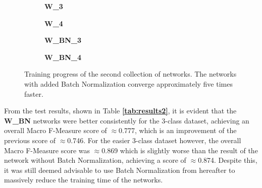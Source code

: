 \begin {figure}[!htb]
	\begin {subfigure}[b]{0.4\linewidth}
		\scalebox{0.65}{}
		\caption{\textbf{W\_3}}
	\end {subfigure}\hspace{1.75cm}
	\begin {subfigure}[b]{0.4\linewidth}
		\scalebox{0.65}{}
		\caption{\textbf{W\_4}}
	\end {subfigure}

	\begin {subfigure}[b]{0.4\linewidth}
		\scalebox{0.65}{}
		\caption{\textbf{W\_BN\_3}}
	\end {subfigure}\hspace{1.75cm}
	\begin {subfigure}[b]{0.4\linewidth}
		\scalebox{0.65}{}
		\caption{\textbf{W\_BN\_4}}
	\end {subfigure}

		\caption[Training progress of the second collection of networks.]{Training progress of the second collection of networks. The networks with added Batch Normalization converge approximately five times faster.}
		\label{fig:weighted_weighted_batchnorm_training}
\end {figure}

\noindent From the test results, shown in Table \textbf{\ref{tab:results2}}, it is evident that the \textbf{W\_BN} networks were better consistently for the 3-class dataset, achieving an overall Macro F-Measure score of $\approx$0.777, which is an improvement of the previous score of $\approx$0.746. For the easier 3-class dataset however, the overall Macro F-Measure score was $\approx$0.869 which is slightly worse than the result of the network without Batch Normalization, achieving a score of $\approx$0.874. Despite this, it was still deemed advisable to use Batch Normalization from hereafter to massively reduce the training time of the networks.\\

